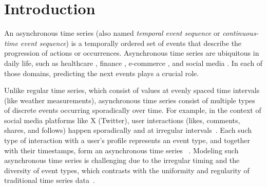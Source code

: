 
\section{Introduction}

An asynchronous time series (also named \textit{temporal event sequence} or \textit{continuous-time event sequence}) is a temporally ordered set of events that describe the progression of actions or occurrences. Asynchronous time series are ubiquitous in daily life, such as healthcare \citep{Lorch2018Stochastic, Rizoiu2018SirHawkes}, finance \citep{Bacry2015Hawkes, Jin2020Visual}, e-commerce \citep{Hernandez2017Analysis}, and social media \citep{Zhang2022Counterfactual, Kong2023Interval}. In each of those domains, predicting the next events plays a crucial role. %

Unlike regular time series, which consist of values at evenly spaced time intervals (like weather measurements), asynchronous time series consist of multiple types of discrete events occurring sporadically over time. For example, in the context of social media platforms like X (Twitter), user interactions (likes, comments, shares, and follows) happen sporadically and at irregular intervals~\citep{zhao2015seismic}.  Each such type of interaction with a user's profile represents an event type, and together with their timestamps, form an asynchronous time series~ \citep{Xue2023EasyTPP}. Modeling such asynchronous time series is challenging due to the irregular timing and the diversity of event types, which contrasts with the uniformity and regularity of traditional time series data~\citep{schirmer2022modeling,horn2020set,zhangirregular}.


